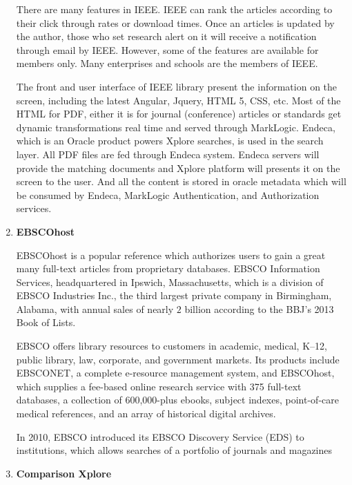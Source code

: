 \begin{enumerate}
	There are many features in IEEE. IEEE can rank the articles according to their click through rates or download times. 
    Once an articles is updated by the author, those who set research alert on it will receive a notification through email by IEEE.
    However, some of the features are available for members only.
    Many enterprises and schools are the members of IEEE.

	
	The front and user interface of IEEE library present the information on the screen, 
	including the latest Angular, Jquery, HTML 5, CSS, etc. 
	Most of the HTML for PDF, either it is for journal (conference) articles or standards get dynamic transformations real time and served through MarkLogic.
	Endeca, which is an Oracle product powers Xplore searches, is used in the search layer.
	All PDF files are fed through Endeca system.
	Endeca servers will provide the matching documents and Xplore platform will presents it on the screen to the user.
	And all the content is stored in oracle metadata which will be consumed by Endeca, MarkLogic Authentication, and Authorization services.
	
	\item\textbf{EBSCOhost}
	\setlength{\parindent}{1em}

	EBSCOhost is a popular reference which authorizes users to gain a great many full-text articles from proprietary databases.
	EBSCO Information Services, headquartered in Ipswich, Massachusetts, 
    which is a division of EBSCO Industries Inc., 
    the third largest private company in Birmingham, Alabama, with annual sales of nearly $2$ billion according to the BBJ's 2013 Book of Lists.

    EBSCO offers library resources to customers in academic, medical, K–12,  
    public library, law, corporate, and government markets. 
	Its products include EBSCONET, a complete e-resource management system,
    and EBSCOhost, which supplies a fee-based online research 
    service with 375 full-text databases, a collection
    of 600,000-plus ebooks, subject indexes, point-of-care 
    medical references, and an array of historical digital archives.

    In 2010, EBSCO introduced its EBSCO Discovery Service (EDS) to institutions,
    which allows searches of a portfolio of journals and magazines

	
	\item\textbf{Comparison Xplore}
	\setlength{\parindent}{1em}
	

\end{enumerate}
